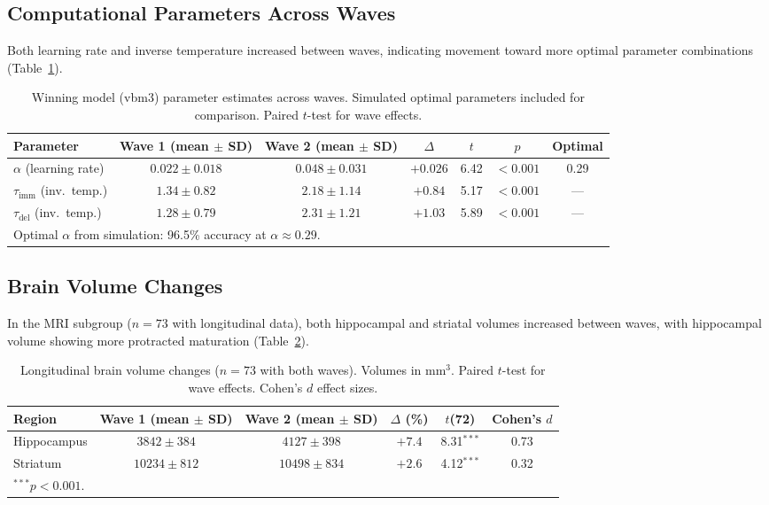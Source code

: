 \documentclass[11pt]{article}
\begin{document}
\subsection{Computational Parameters Across Waves}

Both learning rate and inverse temperature increased between waves, indicating movement toward more optimal parameter combinations (Table~\ref{tab:parameters}).

\begin{table}[H]
\centering
\caption{Winning model (vbm3) parameter estimates across waves. Simulated optimal parameters included for comparison. Paired $t$-test for wave effects.}
\label{tab:parameters}
\begin{tabular}{lcccccc}
\toprule
\textbf{Parameter} & \textbf{Wave 1 (mean $\pm$ SD)} & \textbf{Wave 2 (mean $\pm$ SD)} & \textbf{$\Delta$} & \textbf{$t$} & \textbf{$p$} & \textbf{Optimal} \\
\midrule
$\alpha$ (learning rate) & $0.022 \pm 0.018$ & $0.048 \pm 0.031$ & $+0.026$ & 6.42 & $< 0.001$ & 0.29 \\
$\tau_{\mathrm{imm}}$ (inv.\ temp.) & $1.34 \pm 0.82$ & $2.18 \pm 1.14$ & $+0.84$ & 5.17 & $< 0.001$ & --- \\
$\tau_{\mathrm{del}}$ (inv.\ temp.) & $1.28 \pm 0.79$ & $2.31 \pm 1.21$ & $+1.03$ & 5.89 & $< 0.001$ & --- \\
\bottomrule
\multicolumn{7}{l}{\small Optimal $\alpha$ from simulation: 96.5\% accuracy at $\alpha \approx 0.29$.} \\
\end{tabular}
\end{table}

\subsection{Brain Volume Changes}

In the MRI subgroup ($n = 73$ with longitudinal data), both hippocampal and striatal volumes increased between waves, with hippocampal volume showing more protracted maturation (Table~\ref{tab:brain_volumes}).

\begin{table}[H]
\centering
\caption{Longitudinal brain volume changes ($n = 73$ with both waves). Volumes in mm$^3$. Paired $t$-test for wave effects. Cohen's $d$ effect sizes.}
\label{tab:brain_volumes}
\begin{tabular}{lccccc}
\toprule
\textbf{Region} & \textbf{Wave 1 (mean $\pm$ SD)} & \textbf{Wave 2 (mean $\pm$ SD)} & \textbf{$\Delta$ (\%)} & \textbf{$t$(72)} & \textbf{Cohen's $d$} \\
\midrule
Hippocampus & $3842 \pm 384$ & $4127 \pm 398$ & $+7.4$ & 8.31$^{***}$ & 0.73 \\
Striatum & $10234 \pm 812$ & $10498 \pm 834$ & $+2.6$ & 4.12$^{***}$ & 0.32 \\
\bottomrule
\multicolumn{6}{l}{\small $^{***}p < 0.001$.} \\
\end{tabular}
\end{table}
\end{document}
